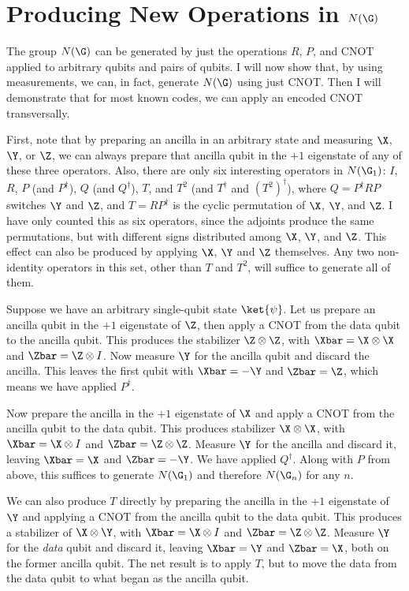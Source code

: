 \section{Producing New Operations in $N(\G)$}
\label{sec-4qubit}

The group $N(\G)$ can be generated by just the operations $R$, $P$, and
CNOT applied to arbitrary qubits and pairs of qubits.  I will now show that,
by using measurements, we can, in fact, generate $N(\G)$ using just CNOT.
Then I will demonstrate that for most known codes, we can apply an
encoded CNOT transversally.

First, note that by preparing an ancilla in an arbitrary state and measuring
$\X$, $\Y$, or $\Z$, we can always prepare that ancilla qubit in the $+1$
eigenstate of any of these three operators.  Also, there are only six
interesting operators in $N(\G_1)$: $I$, $R$, $P$ (and $P^\dagger$), $Q$ (and
$Q^\dagger$), $T$, and $T^2$ (and $T^\dagger$ and $(T^2)^\dagger$), where
$Q = P^\dagger RP$ switches $\Y$ and $\Z$, and $T = RP^\dagger$ is the cyclic
permutation of $\X$, $\Y$, and $\Z$.  I have only counted this as six
operators, since the adjoints produce the same permutations, but with
different signs distributed among $\X$, $\Y$, and $\Z$.  This effect can also
be produced by applying $\X$, $\Y$ and $\Z$ themselves.  Any two
non-identity operators in this set, other than $T$ and $T^2$, will suffice to
generate all of them.

Suppose we have an arbitrary single-qubit state $\ket{\psi}$.  Let us
prepare an ancilla qubit in the $+1$ eigenstate of $\Z$, then apply a CNOT
from the data qubit to the ancilla qubit.  This produces the stabilizer $\Z
\otimes \Z$, with $\Xbar = \X \otimes \X$ and $\Zbar = \Z \otimes I$.
Now measure $\Y$ for the ancilla qubit and discard the ancilla.  This leaves
the first qubit with $\Xbar = -\Y$ and $\Zbar = \Z$, which means we have
applied $P^\dagger$.

Now prepare the ancilla in the $+1$ eigenstate of $\X$ and apply a CNOT
from the ancilla qubit to the data qubit.  This produces stabilizer $\X
\otimes \X$, with $\Xbar = \X \otimes I$ and $\Zbar = \Z \otimes \Z$.
Measure $\Y$ for the ancilla and discard it, leaving $\Xbar = \X$ and
$\Zbar = -\Y$.  We have applied $Q^\dagger$.  Along with $P$ from above, this
suffices to generate $N(\G_1)$ and therefore $N(\G_n)$ for any $n$.

We can also produce $T$ directly by preparing the ancilla in the $+1$
eigenstate of $\Y$ and applying a CNOT from the ancilla qubit to the data
qubit.  This produces a stabilizer of $\X \otimes \Y$, with $\Xbar = \X
\otimes I$ and $\Zbar = \Z \otimes \Z$.  Measure $\Y$ for the {\em data}
qubit and discard it, leaving $\Xbar = \Y$ and $\Zbar = \X$, both on the
former ancilla qubit.   The net result is to apply $T$, but to move the
data from the data qubit to what began as the ancilla qubit.


